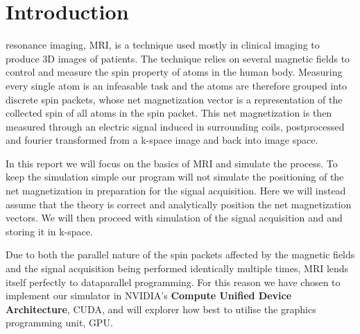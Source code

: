 


\section{Introduction}


 resonance imaging, MRI, is a technique used
mostly in clinical imaging to produce 3D images of patients. The
technique relies on several magnetic fields to control and measure the
spin property of atoms in the human body. Measuring every single atom
is an infeasable task and the atoms are therefore grouped into
discrete spin packets, whose net magnetization vector is a
representation of the collected spin of all atoms in the spin
packet. This net magnetization is then measured through an electric
signal induced in surrounding coils, postprocessed and fourier
transformed from a k-space image and back into image space.


In this report we will focus on the basics of MRI and simulate the
process. To keep the simulation simple our program will not simulate
the positioning of the net magnetization in preparation for the signal
acquisition. Here we will instead assume that the theory is correct
and analytically position the net magnetization vectors. We will then
proceed with simulation of the signal acquisition and and storing it
in k-space.


Due to both the parallel nature of the spin packets affected by the
magnetic fields and the signal acquisition being performed identically
multiple times, MRI lends itself perfectly to dataparallel
programming. For this reason we have chosen to implement our simulator
in NVIDIA's \textbf{Compute Unified Device Architecture}, CUDA, and will
explorer how best to utilise the graphics programming unit, GPU.



